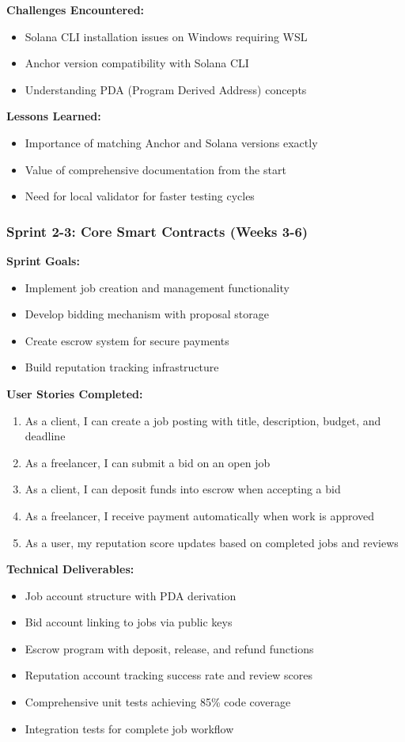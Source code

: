\documentclass[a4paper,13pt,twoside]{report}
\theoremstyle{definition}
\begin{document}
\textbf{Challenges Encountered:}
\begin{itemize}
    \item Solana CLI installation issues on Windows requiring WSL
    \item Anchor version compatibility with Solana CLI
    \item Understanding PDA (Program Derived Address) concepts
\end{itemize}

\textbf{Lessons Learned:}
\begin{itemize}
    \item Importance of matching Anchor and Solana versions exactly
    \item Value of comprehensive documentation from the start
    \item Need for local validator for faster testing cycles
\end{itemize}

\subsubsection{Sprint 2-3: Core Smart Contracts (Weeks 3-6)}

\textbf{Sprint Goals:}
\begin{itemize}
    \item Implement job creation and management functionality
    \item Develop bidding mechanism with proposal storage
    \item Create escrow system for secure payments
    \item Build reputation tracking infrastructure
\end{itemize}

\textbf{User Stories Completed:}
\begin{enumerate}
    \item As a client, I can create a job posting with title, description, budget, and deadline
    \item As a freelancer, I can submit a bid on an open job
    \item As a client, I can deposit funds into escrow when accepting a bid
    \item As a freelancer, I receive payment automatically when work is approved
    \item As a user, my reputation score updates based on completed jobs and reviews
\end{enumerate}

\textbf{Technical Deliverables:}
\begin{itemize}
    \item Job account structure with PDA derivation
    \item Bid account linking to jobs via public keys
    \item Escrow program with deposit, release, and refund functions
    \item Reputation account tracking success rate and review scores
    \item Comprehensive unit tests achieving 85\% code coverage
    \item Integration tests for complete job workflow
\end{itemize}
\end{document}
